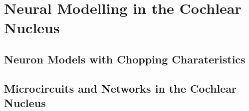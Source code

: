 \documentclass[10pt,a4paper,twoside,openright]{book}
\begin{document}
\section{Neural Modelling in the Cochlear Nucleus}

\subsection{Neuron Models with Chopping Charateristics}

\subsection{Microcircuits and Networks in the Cochlear Nucleus}

\begin{landscape}
{\small{}}  
\end{landscape}

\newpage
\listoftodos
\end{document}
